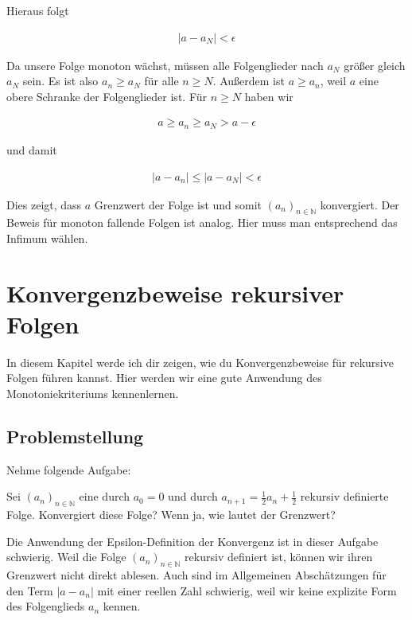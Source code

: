 \documentclass[fontsize=9pt,
               parskip=half-,
               DIV=14,
               listof=chapterentry,
               tocflat]{scrbook}
\begin{document}
\begin{proof*}
Hieraus folgt

\begin{align*}
|a-a_{N}|<\epsilon 
\end{align*}

Da unsere Folge monoton wächst, müssen alle Folgenglieder nach $a_{N}$ größer gleich $a_{N}$ sein. Es ist also $a_{n}\geq a_{N}$ für alle $n\geq N$. Außerdem ist $a\geq a_{n}$, weil $a$ eine obere Schranke der Folgenglieder ist. Für $n\geq N$ haben wir

\begin{align*}
a\geq a_{n}\geq a_{N}>a-\epsilon 
\end{align*}

und damit

\begin{align*}
|a-a_{n}|\leq |a-a_{N}|<\epsilon 
\end{align*}

Dies zeigt, dass $a$ Grenzwert der Folge ist und somit $(a_{n})_{n\in \mathbb {N} }$ konvergiert. Der Beweis für monoton fallende Folgen ist analog. Hier muss man entsprechend das Infimum wählen.

\end{proof*}

\chapter{Konvergenzbeweise rekursiver Folgen}

In diesem Kapitel werde ich dir zeigen, wie du Konvergenzbeweise für rekursive Folgen führen kannst. Hier werden wir eine gute Anwendung des Monotoniekriteriums kennenlernen.

\section{Problemstellung}

Nehme folgende Aufgabe:

\begin{importantparagraph*}
Sei $(a_{n})_{n\in \mathbb {N} }$ eine durch $a_{0}=0$ und durch $a_{n+1}={\tfrac {1}{2}}a_{n}+{\tfrac {1}{2}}$ rekursiv definierte Folge. Konvergiert diese Folge? Wenn ja, wie lautet der Grenzwert?

\end{importantparagraph*}

Die Anwendung der Epsilon-Definition der Konvergenz ist in dieser Aufgabe schwierig. Weil die Folge $(a_{n})_{n\in \mathbb {N} }$ rekursiv definiert ist, können wir ihren Grenzwert nicht direkt ablesen. Auch sind im Allgemeinen Abschätzungen für den Term $|a-a_{n}|$ mit einer reellen Zahl schwierig, weil wir keine explizite Form des Folgenglieds $a_{n}$ kennen.
\end{document}
